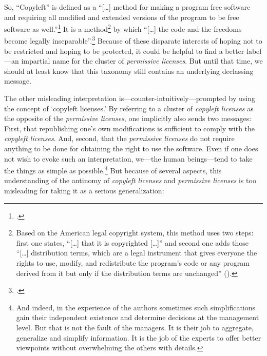 So, \enquote{Copyleft} is defined
as a \enquote{[\ldots] method for making a program free software and requiring
all modified and extended versions of the program to be free software as
well.}\footcite[cf.][89]{Stallman1996c} It is a method\footnote{Based on the
American legal copyright system, this method uses two steps: first one states,
\enquote{[\ldots] that it is copyrighted [\ldots]} and second one adds those
\enquote{[\ldots] distribution terms, which are a legal instrument that gives
everyone the rights to use, modify, and redistribute the program's code or any
program derived from it but only if the distribution terms are unchanged}
(\cite[cf.][89]{Stallman1996c}).} by which \enquote{[\ldots] the code and the
freedoms become legally inseparable}.\footcite[cf.][89]{Stallman1996c} Because
of these disparate interests of hoping not to be restricted and hoping to be
protected, it could be helpful to find a better label---an impartial name for
the cluster of \emph{permissive licenses}. But until that time, we should at
least know that this taxonomy still contains an underlying declassing message.

The other misleading interpretation is---counter-intuitively---prompted by using
the concept of `copyleft licenses.' By referring to a cluster of \emph{copyleft
licenses} as the opposite of the \emph{permissive licenses}, one implicitly also
sends two messages: First, that republishing one's own modifications is
sufficient to comply with the \emph{copyleft licenses}. And, second, that the
\emph{permissive licenses} do not require anything to be done for obtaining the
right to use the software. Even if one does not wish to evoke such an
interpretation, we---the human beings---tend to take the things as simple as
possible.\footnote{And indeed, in the experience of the authors sometimes
such simplifications gain their independent existence and determine decisions at
the management level. But that is not the fault of the managers. It is their
job to aggregate, generalize and simplify information. It is the job of the
experts to offer better viewpoints without overwhelming the others with
details.} But because of several aspects, this understanding of the antinomy of
\emph{copyleft licenses} and \emph{permissive licenses} is too misleading for
taking it as a serious generalization:

